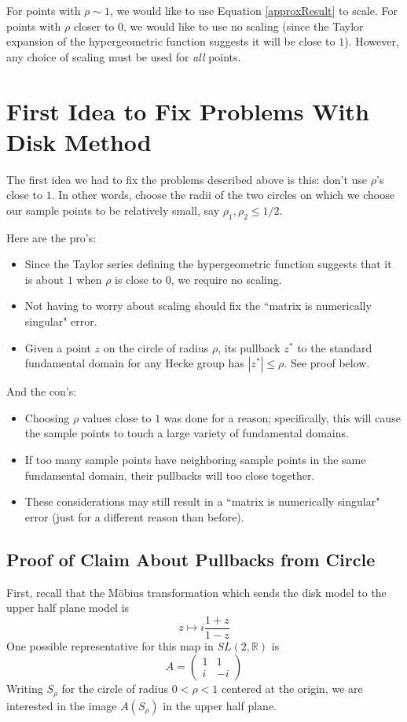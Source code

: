 \documentclass[]{article}
\begin{document}
For points with $\rho \sim 1$, we would like to use Equation \ref{approxResult} to scale.
For points with $\rho$ closer to $0$, we would like to use no scaling (since the Taylor expansion of the hypergeometric function suggests it will be close to $1$).
However, any choice of scaling must be used for \textit{all} points.

\section{First Idea to Fix Problems With Disk Method}\label{fix1}

The first idea we had to fix the problems described above is this: don't use $\rho$'s close to $1$.
In other words, choose the radii of the two circles on which we choose our sample points to be relatively small, say $\rho_1, \rho_2 \leq 1/2$.

Here are the pro's:
\begin{itemize}
	\item Since the Taylor series defining the hypergeometric function suggests that it is about $1$ when $\rho$ is close to $0$, we require no scaling.
	\item Not having to worry about scaling should fix the ``matrix is numerically singular" error.
	\item Given a point $z$ on the circle of radius $\rho$, its pullback $z^*$ to the standard fundamental domain for any Hecke group has $|z^*| \leq \rho$.
	See proof below.
\end{itemize}
And the con's:
\begin{itemize}
	\item Choosing $\rho$ values close to $1$ was done for a reason; specifically, this will cause the sample points to touch a large variety of fundamental domains.
	\item If too many sample points have neighboring sample points in the same fundamental domain, their pullbacks will too close together.
	\item These considerations may still result in a ``matrix is numerically singular" error (just for a different reason than before).
\end{itemize}

\subsection{Proof of Claim About Pullbacks from Circle}

First, recall that the M\"obius transformation which sends the disk model to the upper half plane model is
$$
z \mapsto i\frac{1 + z}{1 - z}
$$
One possible representative for this map in $SL(2, \mathbb{R})$ is
\[
	A =
	\begin{pmatrix}
		1 & 1 \\
		i & -i
	\end{pmatrix}
\]
Writing $S_\rho$ for the circle of radius $0<\rho<1$ centered at the origin, we are interested in the image $A(S_\rho)$ in the upper half plane.
\end{document}

